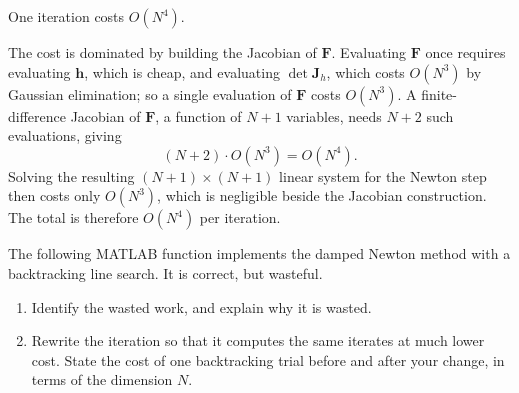 \begin{solution}
    
    One iteration costs $O(N^4)$.

    The cost is dominated by building the Jacobian of $\mathbf{F}$. Evaluating $\mathbf{F}$ once requires evaluating $\mathbf{h}$, which is cheap, and evaluating $\det \mathbf{J}_h$, which costs $O(N^3)$ by Gaussian elimination; so a single evaluation of $\mathbf{F}$ costs $O(N^3)$. A finite-difference Jacobian of $\mathbf{F}$, a function of $N+1$ variables, needs $N+2$ such evaluations, giving
    \[
        (N+2) \cdot O(N^3) = O(N^4) .
    \]
    Solving the resulting $(N+1) \times (N+1)$ linear system for the Newton step then costs only $O(N^3)$, which is negligible beside the Jacobian construction. The total is therefore $O(N^4)$ per iteration.
    
\end{solution}

\begin{exercise} %
    
    The following MATLAB function implements the damped Newton method with a backtracking line search. It is correct, but wasteful.
    
    \begin{enumerate}[label=(\alph*)]
        \item Identify the wasted work, and explain why it is wasted.
        \item Rewrite the iteration so that it computes the same iterates at much lower cost. State the cost of one backtracking trial before and after your change, in terms of the dimension $N$.
    \end{enumerate}
    
\end{exercise}

